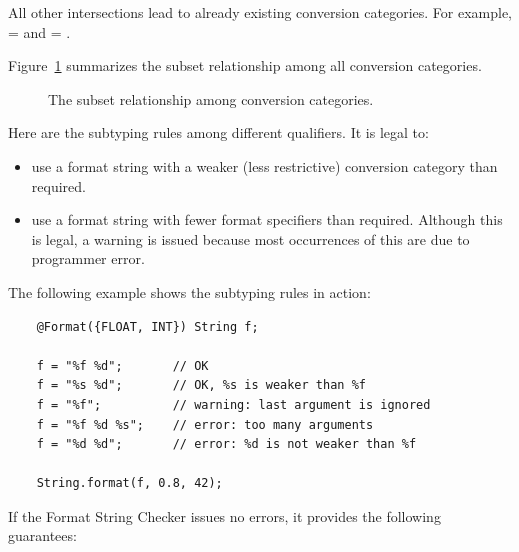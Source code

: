 \noindent All other intersections lead to already existing conversion categories.
For example,  \capsym{}  =  and
 \capsym{}  = .

Figure~\ref{fig-formatter-cat} summarizes the subset
relationship among all conversion categories.

\begin{figure}[thbp]
    \caption{The subset relationship
        among conversion categories.}
    \label{fig-formatter-cat}
\end{figure}



Here are the subtyping rules among different
qualifiers.
It is legal to:

\begin{itemize}
\item use a format string with a weaker (less restrictive) conversion category than required.
\item use a format string with fewer format specifiers than required.
  Although this is legal, a warning is issued because most occurrences of
  this are due to programmer error.
\end{itemize}

The following example shows the subtyping rules in action:

\begin{Verbatim}
    @Format({FLOAT, INT}) String f;

    f = "%f %d";       // OK
    f = "%s %d";       // OK, %s is weaker than %f
    f = "%f";          // warning: last argument is ignored
    f = "%f %d %s";    // error: too many arguments
    f = "%d %d";       // error: %d is not weaker than %f

    String.format(f, 0.8, 42);
\end{Verbatim}


If the Format String Checker issues no errors, it provides the following guarantees:

